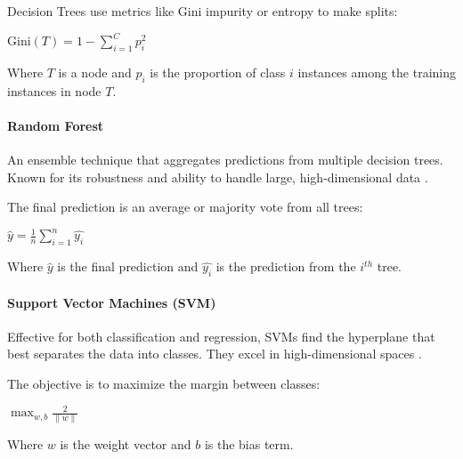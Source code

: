         \begin{minipage}{\dimexpr\linewidth-20pt}
            Decision Trees use metrics like Gini impurity or entropy to make splits:
            \par
            \vspace{2em}
            \begin{center}
                $
                \text{Gini}(T) = 1 - \sum_{i=1}^{C} p_i^2
                $
            \end{center}
            \vspace{1em}
            Where \( T \) is a node and \( p_i \) is the proportion of class \( i \) instances among the training instances in node \( T \).
        \end{minipage}

        \paragraph{Random Forest}
        An ensemble technique that aggregates predictions from multiple decision trees. Known for its robustness and ability to handle large, high-dimensional data \cite{probst_hyperparameters_2019}.

        \begin{minipage}{\dimexpr\linewidth-20pt}
            The final prediction is an average or majority vote from all trees:
            \par
            \vspace{2em}
            \begin{center}
                $
                \hat{y} = \frac{1}{n} \sum_{i=1}^{n} \hat{y_i}
                $
            \end{center}
            \vspace{1em}
            Where \( \hat{y} \) is the final prediction and \( \hat{y_i} \) is the prediction from the \( i^{th} \) tree.
        \end{minipage}

        \paragraph{Support Vector Machines (SVM)}
        Effective for both classification and regression, SVMs find the hyperplane that best separates the data into classes. They excel in high-dimensional spaces \cite{wu_analysis_2006}.

        \begin{minipage}{\dimexpr\linewidth-20pt}
            The objective is to maximize the margin between classes:
            \par
            \vspace{2em}
            \begin{center}
                $
                \max_{w, b} \frac{2}{\| w \|}
                $
            \end{center}
            \vspace{1em}
            Where \( w \) is the weight vector and \( b \) is the bias term.
        \end{minipage}

